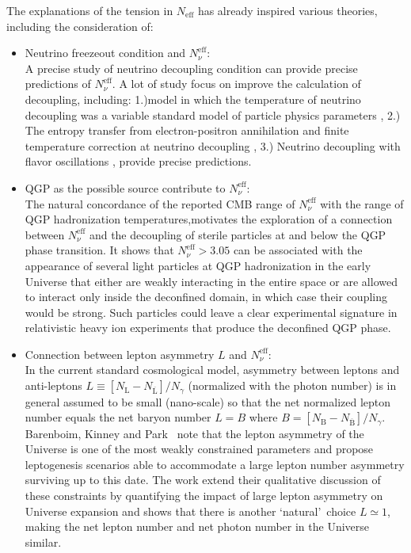 \documentclass[universe,article,submit,moreauthors,pdftex,a4paper]{Definitions/mdpi}
\begin{document}
 The explanations of the tension in $N_\mathrm{eff}$ has already inspired various theories, including the consideration of:
\begin{itemize}
\item Neutrino freezeout condition and $N_\nu^{\mathrm{eff}}$:\\
A precise study of neutrino decoupling condition can provide precise predictions of $N_\nu^{\mathrm{eff}}$. A lot of study focus on improve the calculation of decoupling, including:
1.)model in which the temperature of neutrino decoupling was a variable standard model of particle physics parameters \cite{Birrell:2014uka}, 2.) The entropy transfer from electron-positron annihilation and finite temperature correction at neutrino decoupling \cite{Dicus:1982bz, Heckler:1994tv, Fornengo:1997wa}, 3.) Neutrino decoupling with flavor oscillations \cite{Mangano:2005cc,Mangano:2001iu}, provide precise predictions.


\item QGP as the possible source contribute to $N_\nu^{\mathrm{eff}}$:\\
The natural concordance of the reported CMB range of $N_\nu^{\mathrm{eff}}$ with the range of QGP hadronization temperatures,motivates the exploration of a connection between $N_\nu^{\mathrm{eff}}$ and the decoupling of sterile particles at and below the QGP phase transition\cite{Birrell:2014cja}. It shows that $N_\nu^{\mathrm{eff}}>3.05$ can be associated with the appearance of several light particles at QGP hadronization in the early Universe that either are weakly interacting in the entire space or are allowed to interact only inside the deconfined domain, in which case their coupling would be strong. Such particles could leave a clear experimental signature in relativistic heavy ion experiments that produce the deconfined QGP phase.

\item Connection between lepton asymmetry $L$ and $N_\nu^{\mathrm{eff}}$:\\
In the current standard cosmological model, asymmetry between leptons and anti-leptons $L\equiv  [N_\mathrm{L}-N_{\overline{\mathrm{L}}}] /N_\gamma $  (normalized with the photon number) is in general assumed to be small (nano-scale) so that the net normalized lepton number equals the net baryon number $L=B$ where $B=[N_\mathrm{B}-N_{\overline{\mathrm{B}}}]/N_\gamma $. Barenboim, Kinney and Park~\cite{Barenboim:2016shh,Barenboim:2017dfq}  note that the lepton asymmetry of the Universe is one of the most weakly constrained parameters and propose leptogenesis scenarios able to accommodate a large lepton number asymmetry surviving up to this date. The work \cite{Yang:2018oqg}  extend their qualitative discussion of these constraints by quantifying the impact of large lepton asymmetry on Universe expansion and shows that there is another \lq natural\rq\ choice  $L\simeq 1$, making the  net lepton number and net photon number in the Universe similar. 

\end{itemize}
\end{document}
